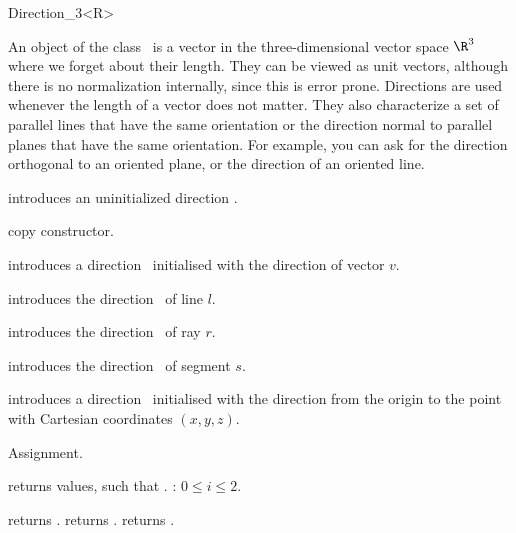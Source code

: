 \begin{ccRefClass}{Direction_3<R>}

\ccDefinition
An object of the class \ccRefName\ is a vector in the three-dimensional 
vector space $\R^3$  where we forget about their length. They can be
viewed as unit vectors, although there is no normalization internally,
since this is error prone.  Directions are used whenever the length of
a vector does not matter. 
They also characterize a set of parallel lines that have the same orientation 
or the direction normal to parallel planes that have the same orientation.
For example, you can ask for the direction
orthogonal to an oriented plane, or the direction of an oriented line.


\ccCreation
{}


\ccHidden {}
             {introduces an uninitialized direction \ccVar.}

\ccHidden {}
            {copy constructor.}

            {introduces a direction \ccVar\ initialised with the 
             direction of vector $v$.}

            {introduces the direction \ccVar\ of line $l$.}

            {introduces the direction \ccVar\ of ray $r$.}

            {introduces the direction \ccVar\ of segment $s$.}

            {introduces a direction \ccVar\ initialised with the direction 
             from the origin to the point with Cartesian coordinates $(x, y, z)$.}


\ccOperations

\ccHidden {}
        {Assignment.}

       {returns values, such that \ccVar {}.
        \ccPrecond: $0 \leq i \leq 2$.}

       {returns .}
\ccGlue
{}
       {returns .}
\ccGlue
{}
       {returns .}



\end{ccRefClass}
